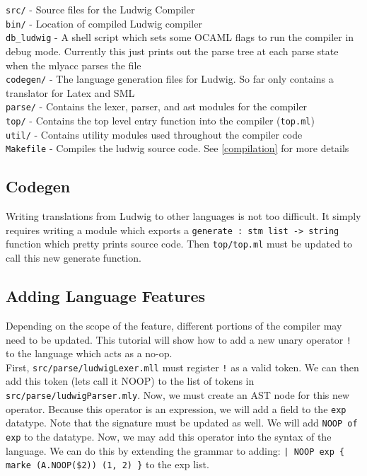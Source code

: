 \documentclass[11pt]{article}
\newcommand{\ind}{\-\hspace{0.25in}}
\begin{document}
\verb|src/| - Source files for the Ludwig Compiler\\
\ind \verb|bin/| - Location of compiled Ludwig compiler\\
\ind \ind \verb|db_ludwig| - A shell script which sets some OCAML flags to run the compiler in debug mode. Currently this just prints out the parse tree at each parse state when the mlyacc parses the file\\
\ind \verb|codegen/| - The language generation files for Ludwig. So far only contains a translator for Latex and SML\\
\ind \verb|parse/| - Contains the lexer, parser, and ast modules for the compiler\\
\ind \verb|top/| - Contains the top level entry function into the compiler (\verb|top.ml|)\\
\ind \verb|util/| - Contains utility modules used throughout the compiler code\\
\ind \verb|Makefile| - Compiles the ludwig source code. See \ref{compilation} for more details\\

\subsection{Codegen}

Writing translations from Ludwig to other languages is not too difficult. It simply requires writing a module which exports a \verb|generate : stm list -> string| function which pretty prints source code. Then \verb|top/top.ml| must be updated to call this new generate function.

\subsection{Adding Language Features}

Depending on the scope of the feature, different portions of the compiler may need to be updated. This tutorial will show how to add a new unary operator \verb|!| to the language which acts as a no-op.\\

First, \verb|src/parse/ludwigLexer.mll| must register \verb|!| as a valid token. We can then add this token (lets call it NOOP) to the list of tokens in \verb|src/parse/ludwigParser.mly|. Now, we must create an AST node for this new operator. Because this operator is an expression, we will add a field to the \verb|exp| datatype. Note that the signature must be updated as well. We will add \verb|NOOP of exp| to the datatype. Now, we may add this operator into the syntax of the language. We can do this by extending the grammar to adding:
\verb"| NOOP exp { marke (A.NOOP($2)) (1, 2) }" to the exp list.\\
\end{document}
